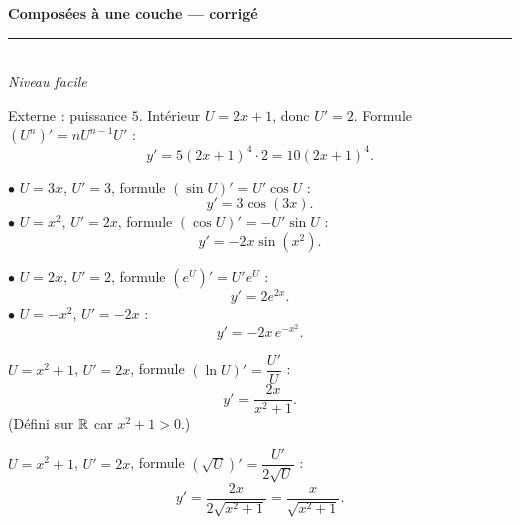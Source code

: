 \pagestyle{fancy}\fancyhf{}
\fancyfoot[C]{\small\thepage}
\renewcommand{\headrulewidth}{0.8pt}



\begin{center}
{\LARGE\bfseries\color{primarydark} Composées à une couche — corrigé}\\[2pt]
{\color{primary}\rule{0.5\textwidth}{1.2pt}}\\[4pt]
{\small\itshape Niveau facile}
\end{center}
\vspace{2mm}

\begin{corr}[1 --- $y=(2x+1)^5$]
Externe : puissance $5$. Intérieur $U=2x+1$, donc $U'=2$. Formule $(U^n)'=nU^{n-1}U'$ :
\[
y'=5(2x+1)^4\cdot 2 = 10(2x+1)^4.
\]
\end{corr}

\begin{corr}[2 --- $y=\sin(3x)$ puis $y=\cos(x^2)$]
$\bullet$ $U=3x$, $U'=3$, formule $(\sin U)'=U'\cos U$ :
\[
y'=3\cos(3x).
\]
$\bullet$ $U=x^2$, $U'=2x$, formule $(\cos U)'=-U'\sin U$ :
\[
y'=-2x\sin(x^2).
\]
\end{corr}

\begin{corr}[3 --- $y=e^{2x}$ puis $y=e^{-x^2}$]
$\bullet$ $U=2x$, $U'=2$, formule $(e^U)'=U'e^U$ :
\[
y'=2e^{2x}.
\]
$\bullet$ $U=-x^2$, $U'=-2x$ :
\[
y'=-2x\,e^{-x^2}.
\]
\end{corr}

\begin{corr}[4 --- $y=\ln(x^2+1)$]
$U=x^2+1$, $U'=2x$, formule $(\ln U)'=\dfrac{U'}{U}$ :
\[
y'=\frac{2x}{x^2+1}.
\]
(Défini sur $\mathbb{R}$ car $x^2+1>0$.)
\end{corr}

\begin{corr}[5 --- $y=\sqrt{x^2+1}$]
$U=x^2+1$, $U'=2x$, formule $(\sqrt U)'=\dfrac{U'}{2\sqrt U}$ :
\[
y'=\frac{2x}{2\sqrt{x^2+1}}=\frac{x}{\sqrt{x^2+1}}.
\]
\end{corr}


